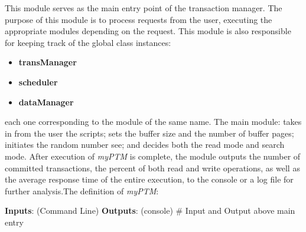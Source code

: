 This module serves as the main entry point of the transaction manager. The purpose of this module is to process requests from the user, executing the appropriate modules depending on the request. This module is also responsible for keeping track of the global class instances:

\begin{itemize}
 \item \textbf{transManager} 
 \item \textbf{scheduler} 
 \item  \textbf{dataManager} 
 \end{itemize}

each one corresponding to the module of the same name. The main module: takes in from the user the scripts; sets the buffer size and the number of buffer pages; initiates the random number see; and decides both the read mode and search mode. After execution of \textit{myPTM} is complete, the module outputs the number of committed transactions, the percent of both read and write operations, as well as the average response time of the entire execution, to the console or a log file for further analysis.The definition of \textit{myPTM}:\\

\begin{mdframed}
\begin{algorithmic}[H]

    \State \textbf{Inputs}: (Command Line)
    \State {}
    \State {}
     \State {}
     \State {}
     \State {}
      \State {}
      \State {}
      \State \textbf{Outputs}: (console)
       \State {}
        \State {}
         \State {}
    	 \State {}
	\State \# Input and Output above
	 {} 
	\State main entry
	\EndFunction  
\end{algorithmic} 
\end{mdframed} 



